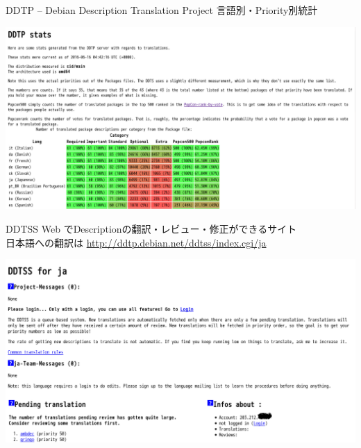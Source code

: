  \begin{frame}{DDTP -- Debian Description Translation Project}
   言語別・Priority別統計

   \begin{center} 
  \includegraphics[width=\hsize]{image201606/stats-sid.png}
   \end{center}
 \end{frame}

 \begin{frame}{DDTSS}
   Web でDescriptionの翻訳・レビュー・修正ができるサイト\\
   日本語への翻訳は
   \url{http://ddtp.debian.net/ddtss/index.cgi/ja}

   \begin{center} 
  \includegraphics[width=0.9\hsize]{image201606/ddtss-anonymous.png}
   \end{center}
 \end{frame}

